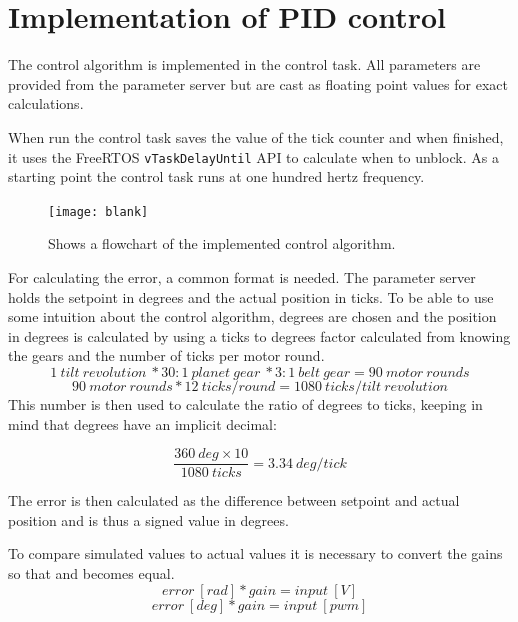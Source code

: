 
\section{Implementation of PID control}
The control algorithm is implemented in the control task. All parameters are provided from the parameter server but are cast as  floating point values for exact calculations.

When run the control task saves the value of the tick counter and when finished, it uses the FreeRTOS \texttt{vTaskDelayUntil} API to calculate when to unblock. As a starting point the control task runs at one hundred hertz frequency.

\begin{figure}[htb]
	\begin{center}
	\texttt{[image: blank]} %
	\caption{Shows a flowchart of the implemented control algorithm.}
	\label{fig:pid_flow}			
	\end{center}
\end{figure}

For calculating the error, a common format is needed. The parameter server holds the setpoint in degrees and the actual position in ticks. To be able to use some intuition about the control algorithm, degrees are chosen and the position in degrees is calculated by using a ticks to degrees factor calculated from knowing the gears and the number of ticks per motor round.
\begin{equation}
1 \ tilt \ revolution \ * 30:1 \ planet \ gear \ * 3:1 \ belt \ gear = 90 \ motor \ rounds
\end{equation}
\begin{equation}
 90 \ motor \ rounds * 12 \ ticks/round = 1080 \ ticks/tilt \ revolution
\end{equation}
This number is then used to calculate the ratio of degrees to ticks, keeping in mind that degrees have an implicit decimal:

\begin{equation}
\frac{360 \ deg \times 10}{1080 \ ticks} = 3.34\ deg/tick 
\end{equation}

The error is then calculated as the difference between setpoint and actual position and is thus a signed value in degrees.

To compare simulated values to actual values it is necessary to convert the gains so that \label{eq:conv1} and \label{eq:conv2} becomes equal. 
\begin{equation}
error \ [rad] * gain = input \ [V]
\label{eq:conv1}
\end{equation}
\begin{equation}
error \ [deg] * gain = input \ [pwm]
\label{eq:conv2}
\end{equation}

